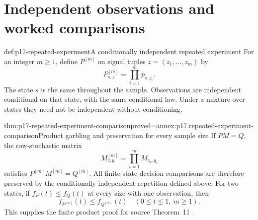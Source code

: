 \section{Independent observations and worked comparisons}
\label{sec:p17-repeated-information}

\begin{hbdefinition}{def:p17-repeated-experiment}{A conditionally independent repeated experiment}
For an integer \(m\geq1\), define \(P^{[m]}\) on signal tuples
\(z=(z_1,\ldots,z_m)\) by
\[
                         P^{[m]}_{s,z}=\prod_{i=1}^m p_{s,z_i}.
\]
The state \(s\) is the same throughout the sample. Observations are
independent conditional on that state, with the same conditional law.
Under a mixture over states they need not be independent without conditioning.
\end{hbdefinition}

\begin{hbtheorem}{thm:p17-repeated-experiment-comparison}{proved=annex:p17.repeated-experiment-comparison}{Product garbling and preservation for every sample size}
If \(PM=Q\), the row-stochastic matrix
\[
                M^{[m]}_{z,y}=\prod_{i=1}^m M_{z_i,y_i}
\]
satisfies \(P^{[m]}M^{[m]}=Q^{[m]}\).
All finite-state decision comparisons are therefore preserved by the
conditionally independent repetition defined above.
For two states, if \(f_P(t)\leq f_Q(t)\) at every size with one observation,
then
\[
                     f_{P^{[m]}}(t)\leq f_{Q^{[m]}}(t)
                    \quad(0\leq t\leq1,\ m\geq1).
\]
This supplies the finite product proof for source Theorem~11
\cite[p.~272]{Blackwell1953EquivalentExperiments}.
\end{hbtheorem}

